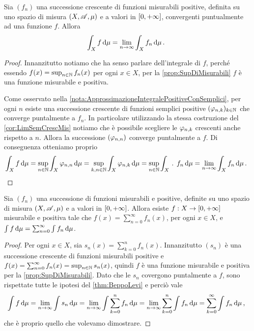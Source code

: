 \begin{theorem}\label{thm:BeppoLevi}
	Sia $(f_n)$ una successione crescente di funzioni misurabili positive, definita su uno spazio di misura $(X,\mathscr A,\mu)$ e a valori in $[0,+\infty]$, convergenti puntualmente ad una funzione $f$. Allora 
	\begin{equation*}
	\int_Xf\,\mathrm d\mu=\lim_{n\to\infty}\int_Xf_n\,\mathrm d\mu\, \text{. }
	\end{equation*}
\end{theorem}

\begin{proof}
	Innanzitutto notiamo che ha senso parlare dell'integrale di $f$, perché essendo $f(x)=\sup_{n\in\mathbb N}f_n(x)$ per ogni $x\in X$, per la \cref{prop:SupDiMisurabili} $f$ è una funzione misurabile e positiva.
	
	Come osservato nella \cref{nota:ApprossimazioneIntegralePositiveConSemplici}, per ogni $n$ esiste una successione crescente di funzioni semplici positive $(\varphi_{n,k})_{k\in\mathbb N}$ che converge puntalmente a $f_n$. In particolare utilizzando la stessa costruzione del \cref{cor:LimSemCrescMis} notiamo che è possibile scegliere le $\varphi_{n,k}$ crescenti anche rispetto a $n$. Allora la successione $(\varphi_{n,n})$ converge puntalmente a $f$. Di conseguenza otteniamo proprio
	\begin{equation*}
		\int_X f\,\mathrm d\mu=\sup_{n\in\mathbb N}\int_X\varphi_{n,n}\,\mathrm d\mu=\sup_{k,n\in\mathbb N}\int_X \varphi_{n,k}\,\mathrm d\mu=\sup_{n\in\mathbb N}\int_X\, \text{. } f_n\,\mathrm d\mu=\lim_{n\to\infty}\int_Xf_n\,\mathrm d\mu\, \text{. }
	\end{equation*}
\end{proof}

\begin{corollary}\label{cor:IntegrazionePerSeriePositive}
	Sia $(f_n)$ una successione di funzioni misurabili e positive, definite su uno spazio di misura $(X,\mathscr A,\mu)$ e a valori in $[0,+\infty]$. Allora esiste $f:X\to[0,+\infty]$ misurabile e positiva tale che $f(x)=\sum_{n=0}^\infty f_n(x)$, per ogni $x\in X$, e $\int f\,\mathrm d\mu=\sum_{n=0}^\infty\int f_n\,\mathrm d\mu$.
\end{corollary}

\begin{proof}
	Per ogni $x\in X$, sia $s_n(x)=\sum_{k=0}^nf_n(x)$. Innanzitutto $(s_n)$ è una successione crescente di funzioni misurabili positive e $f(x)=\sum_{n=0}^\infty f_n(x)=\sup_{n\in\mathbb N}s_n(x)$, quindi $f$ è una funzione misurabile e positiva per la \cref{prop:SupDiMisurabili}. Dato che le $s_n$ covergono puntalmente a $f$, sono rispettate tutte le ipotesi del \cref{thm:BeppoLevi} e perciò vale
	\begin{equation*}
		\int f \,\mathrm d\mu=\lim_{n\to\infty}\int s_n\,\mathrm d\mu=\lim_{n\to\infty}\int \sum_{k=0}^nf_n\,\mathrm d\mu=\lim_{n\to\infty}\sum_{k=0}^n \int f_n\,\mathrm d\mu=\sum_{k=0}^\infty\int f_n\,\mathrm d\mu\, \text{, }
	\end{equation*}
	che è proprio quello che volevamo dimostrare.
\end{proof}

